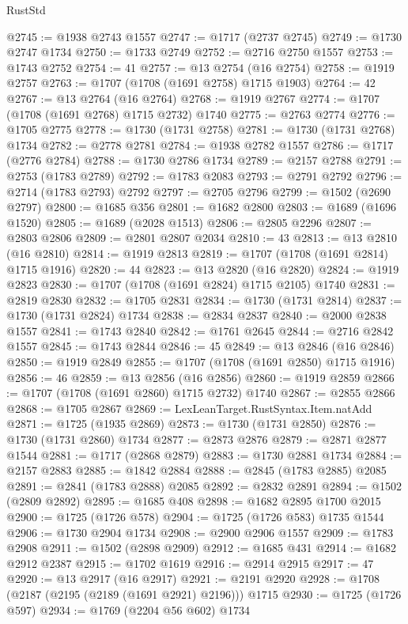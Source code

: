 \begin{lexlean}{RustStd}
\begin{coremodule}
@2745 := @1938 @2743 @1557
@2747 := @1717 (@2737 @2745)
@2749 := @1730 @2747 @1734
@2750 := @1733 @2749
@2752 := @2716 @2750 @1557
@2753 := @1743 @2752
@2754 := 41
@2757 := @13 @2754 (@16 @2754)
@2758 := @1919 @2757
@2763 := @1707 (@1708 (@1691 @2758) @1715 @1903)
@2764 := 42
@2767 := @13 @2764 (@16 @2764)
@2768 := @1919 @2767
@2774 := @1707 (@1708 (@1691 @2768) @1715 @2732) @1740
@2775 := @2763 @2774
@2776 := @1705 @2775
@2778 := @1730 (@1731 @2758)
@2781 := @1730 (@1731 @2768) @1734
@2782 := @2778 @2781
@2784 := @1938 @2782 @1557
@2786 := @1717 (@2776 @2784)
@2788 := @1730 @2786 @1734
@2789 := @2157 @2788
@2791 := @2753 (@1783 @2789)
@2792 := @1783 @2083
@2793 := @2791 @2792
@2796 := @2714 (@1783 @2793) @2792
@2797 := @2705 @2796
@2799 := @1502 (@2690 @2797)
@2800 := @1685 @356
@2801 := @1682 @2800
@2803 := @1689 (@1696 @1520)
@2805 := @1689 (@2028 @1513)
@2806 := @2805 @2296
@2807 := @2803 @2806
@2809 := @2801 @2807 @2034
@2810 := 43
@2813 := @13 @2810 (@16 @2810)
@2814 := @1919 @2813
@2819 := @1707 (@1708 (@1691 @2814) @1715 @1916)
@2820 := 44
@2823 := @13 @2820 (@16 @2820)
@2824 := @1919 @2823
@2830 := @1707 (@1708 (@1691 @2824) @1715 @2105) @1740
@2831 := @2819 @2830
@2832 := @1705 @2831
@2834 := @1730 (@1731 @2814)
@2837 := @1730 (@1731 @2824) @1734
@2838 := @2834 @2837
@2840 := @2000 @2838 @1557
@2841 := @1743 @2840
@2842 := @1761 @2645
@2844 := @2716 @2842 @1557
@2845 := @1743 @2844
@2846 := 45
@2849 := @13 @2846 (@16 @2846)
@2850 := @1919 @2849
@2855 := @1707 (@1708 (@1691 @2850) @1715 @1916)
@2856 := 46
@2859 := @13 @2856 (@16 @2856)
@2860 := @1919 @2859
@2866 := @1707 (@1708 (@1691 @2860) @1715 @2732) @1740
@2867 := @2855 @2866
@2868 := @1705 @2867
@2869 := LexLeanTarget.RustSyntax.Item.natAdd
@2871 := @1725 (@1935 @2869)
@2873 := @1730 (@1731 @2850)
@2876 := @1730 (@1731 @2860) @1734
@2877 := @2873 @2876
@2879 := @2871 @2877 @1544
@2881 := @1717 (@2868 @2879)
@2883 := @1730 @2881 @1734
@2884 := @2157 @2883
@2885 := @1842 @2884
@2888 := @2845 (@1783 @2885) @2085
@2891 := @2841 (@1783 @2888) @2085
@2892 := @2832 @2891
@2894 := @1502 (@2809 @2892)
@2895 := @1685 @408
@2898 := @1682 @2895 @1700 @2015
@2900 := @1725 (@1726 @578)
@2904 := @1725 (@1726 @583) @1735 @1544
@2906 := @1730 @2904 @1734
@2908 := @2900 @2906 @1557
@2909 := @1783 @2908
@2911 := @1502 (@2898 @2909)
@2912 := @1685 @431
@2914 := @1682 @2912 @2387
@2915 := @1702 @1619
@2916 := @2914 @2915
@2917 := 47
@2920 := @13 @2917 (@16 @2917)
@2921 := @2191 @2920
@2928 := @1708 (@2187 (@2195 (@2189 (@1691 @2921) @2196))) @1715
@2930 := @1725 (@1726 @597)
@2934 := @1769 (@2204 @56 @602) @1734

\end{coremodule}
\end{lexlean}
